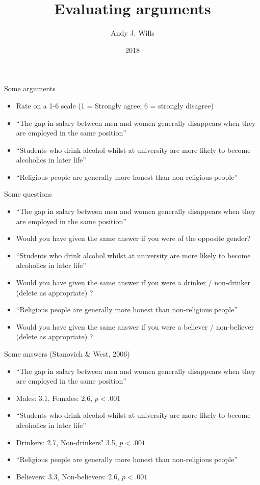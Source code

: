 \documentclass{beamer}
\title[Critical Thinking]{Evaluating arguments}
\author{Andy J. Wills}
\date{2018}
\begin{document}
\frame{\titlepage}

\begin{frame}{Some arguments}
\begin{itemize}
\item Rate on a 1-6 scale (1 = Strongly agree; 6 = strongly disagree)
\item ``The gap in salary between men and women generally disappears when they are employed in the same position''
\item ``Students who drink alcohol whilst at university are more likely to become alcoholics in later life''
\item ``Religious people are generally more honest than non-religious people''
\end{itemize}
\end{frame}

\begin{frame}{Some questions}
\begin{itemize}
\item ``The gap in salary between men and women generally disappears when they are employed in the same position''
\item Would you have given the same answer if you were of the opposite gender?
\item ``Students who drink alcohol whilst at university are more likely to become alcoholics in later life''
\item Would you have given the same answer if you were a drinker / non-drinker (delete as appropriate) ?
\item ``Religious people are generally more honest than non-religious people''
\item Would you have given the same answer if you were a believer / non-believer (delete as appropriate) ?
\end{itemize}
\end{frame}

\begin{frame}{Some answers (Stanovich \& West, 2006)}
\begin{itemize}
\item ``The gap in salary between men and women generally disappears when they are employed in the same position''
\item Males: 3.1, Females: 2.6, $p<.001$
\item ``Students who drink alcohol whilst at university are more likely to become alcoholics in later life''
\item Drinkers: 2.7, Non-drinkers" 3.5, $p<.001$
\item ``Religious people are generally more honest than non-religious people''
\item Believers: 3.3, Non-believers: 2.6, $p<.001$
\end{itemize}
\end{frame}
\end{document}
